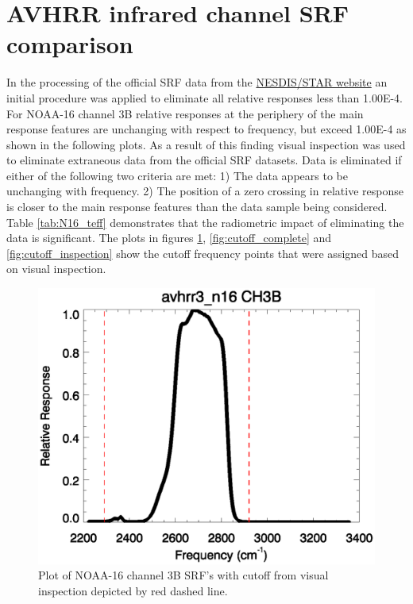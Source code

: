 \section{AVHRR infrared channel SRF comparison}
\label{app:n16}
In the processing of the official SRF data from the 
\href{http://www.star.nesdis.noaa.gov/smcd/spb/fwu/solar_cal/spec_resp_func}{NESDIS/STAR website}
an initial procedure was applied to eliminate all relative responses
less than 1.00E-4. For NOAA-16 channel 3B relative responses at the periphery
of the main response features are unchanging with respect to frequency, but
exceed 1.00E-4 as shown in the following plots. 
As a result of this finding visual inspection was used to eliminate extraneous data
from the official SRF datasets.
Data is eliminated if either of the following two criteria are met:
1) The data appears to be unchanging with frequency. 2) The position of
a zero crossing in relative response is closer to the main response
features than the data sample being considered. Table \ref{tab:N16_teff}
demonstrates that the radiometric impact of eliminating the data is significant.
The plots in figures \ref{fig:nocutoff_complete}, \ref{fig:cutoff_complete} 
and \ref{fig:cutoff_inspection} show the cutoff frequency points that were assigned based 
on visual inspection. 

\begin{figure}[htp]
  \centering
  \includegraphics[scale=1]{graphics/nominal/nocutoff_complete.eps}
  \caption{Plot of NOAA-16 channel 3B SRF's with cutoff from visual inspection depicted
           by red dashed line.}
  \label{fig:nocutoff_complete}
\end{figure}

